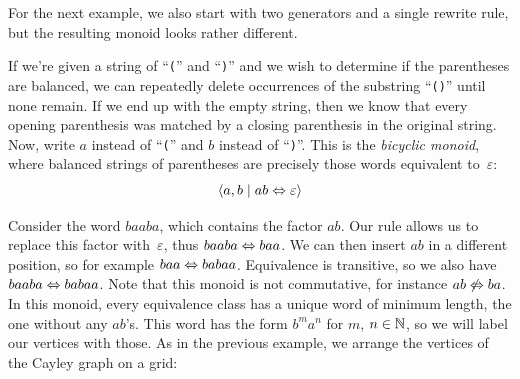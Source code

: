 \documentclass[../generics]{subfiles}
\begin{document}
\begin{example}\label{bicyclic}
For the next example, we also start with two generators and a single rewrite rule, but the resulting monoid looks rather different.

If we're given a string of ``\texttt{(}'' and ``\texttt{)}'' and we wish to determine if the parentheses are balanced, we can repeatedly delete occurrences of the substring ``\texttt{()}'' until none remain. If we end up with the empty string, then we know that every opening parenthesis was matched by a closing parenthesis in the original string. Now, write $a$ instead of ``\texttt{(}'' and $b$ instead of ``\texttt{)}''. This is the \emph{bicyclic monoid}, where balanced strings of parentheses are precisely those words equivalent to~$\varepsilon$:
\[\langle a, b \mid ab\Leftrightarrow\varepsilon\rangle\]

Consider the word $baaba$, which contains the factor $ab$. Our rule allows us to replace this factor with~$\varepsilon$, thus $baaba\Leftrightarrow baa$. We can then insert $ab$ in a different position, so for example $baa\Leftrightarrow babaa$. Equivalence is transitive, so we also have $baaba\Leftrightarrow babaa$. Note that this monoid is not commutative, for instance $ab\not\Leftrightarrow ba$. In this monoid, every equivalence class has a unique word of minimum length, the one without any $ab$'s. This word has the form $b^ma^n$ for $m$, $n\in\mathbb{N}$, so we will label our vertices with those. As in the previous example, we arrange the vertices of the Cayley graph on a grid:

\begin{center}
\end{center}
\end{example}
\end{document}
